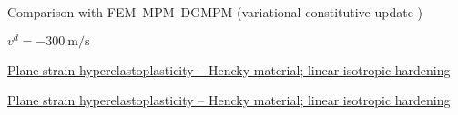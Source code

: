 
%       


\begin{frame}
  \footnotesize Comparison with FEM--MPM--DGMPM (variational constitutive update \cite{LaurentVariational})
  \centering
  
  \footnotesize $v^d = -300 \: \text{m/s}$
  
\end{frame}

\begin{frame}{\href{section4/animation/hyperelastoplasticity/epeq.mp4}{Plane strain hyperelastoplasticity -- Hencky material; linear isotropic hardening}}
  \begin{center}
  \end{center}
\end{frame}

\begin{frame}{\href{section4/animation/hyperelastoplasticity/stress.mp4}{Plane strain hyperelastoplasticity -- Hencky material; linear isotropic hardening}}
  \begin{center}
  \end{center}
\end{frame}


